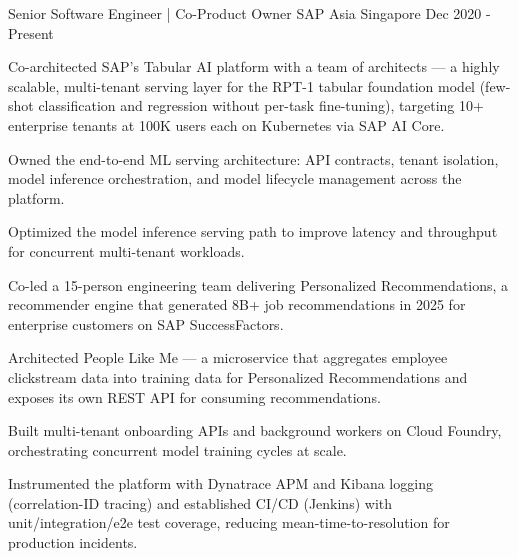 

\begin{cventries}

  \cventry
    {Senior Software Engineer | Co-Product Owner} %
    {SAP Asia} %
    {Singapore} %
    {Dec 2020 - Present} %
    {
      \begin{cvitems} %
        \item {Co-architected SAP's Tabular AI platform with a team of architects --- a highly scalable, multi-tenant serving layer for the RPT-1 tabular foundation model (few-shot classification and regression without per-task fine-tuning), targeting 10+ enterprise tenants at 100K users each on Kubernetes via SAP AI Core.}
        \item {Owned the end-to-end ML serving architecture: API contracts, tenant isolation, model inference orchestration, and model lifecycle management across the platform.}
        \item {Optimized the model inference serving path to improve latency and throughput for concurrent multi-tenant workloads.}
        \item {Co-led a 15-person engineering team delivering Personalized Recommendations, a recommender engine that generated 8B+ job recommendations in 2025 for enterprise customers on SAP SuccessFactors.}
        \item {Architected People Like Me --- a microservice that aggregates employee clickstream data into training data for Personalized Recommendations and exposes its own REST API for consuming recommendations.}
        \item {Built multi-tenant onboarding APIs and background workers on Cloud Foundry, orchestrating concurrent model training cycles at scale.}
        \item {Instrumented the platform with Dynatrace APM and Kibana logging (correlation-ID tracing) and established CI/CD (Jenkins) with unit/integration/e2e test coverage, reducing mean-time-to-resolution for production incidents.}
      \end{cvitems}
    }


\end{cventries}
